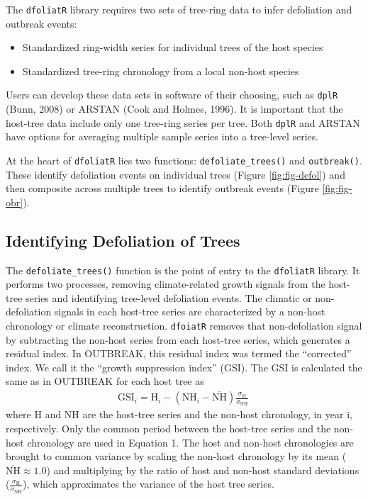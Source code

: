 \documentclass[review]{elsarticle} %
\providecommand{\tightlist}{%
  \setlength{\itemsep}{0pt}\setlength{\parskip}{0pt}}
\begin{document}
The \texttt{dfoliatR} library requires two sets of tree-ring data to infer defoliation and outbreak events:

\begin{itemize}
\tightlist
\item
  Standardized ring-width series for individual trees of the host species
\item
  Standardized tree-ring chronology from a local non-host species
\end{itemize}

Users can develop these data sets in software of their choosing, such as \texttt{dplR} (Bunn, 2008) or ARSTAN (Cook and Holmes, 1996). It is important that the host-tree data include only one tree-ring series per tree. Both \texttt{dplR} and ARSTAN have options for averaging multiple sample series into a tree-level series.

At the heart of \texttt{dfoliatR} lies two functions: \texttt{defoliate\_trees()} and \texttt{outbreak()}. These identify defoliation events on individual trees (Figure \ref{fig:fig-defol}) and then composite across multiple trees to identify outbreak events (Figure \ref{fig:fig-obr}).

\hypertarget{identifying-defoliation-of-trees}{%
\subsection{Identifying Defoliation of Trees}\label{identifying-defoliation-of-trees}}

The \texttt{defoliate\_trees()} function is the point of entry to the \texttt{dfoliatR} library. It performs two processes, removing climate-related growth signals from the host-tree series and identifying tree-level defoliation events. The climatic or non-defoliation signals in each host-tree series are characterized by a non-host chronology or climate reconstruction. \texttt{dfoiatR} removes that non-defoliation signal by subtracting the non-host series from each host-tree series, which generates a residual index. In OUTBREAK, this residual index was termed the ``corrected'' index. We call it the ``growth suppression index'' (GSI). The GSI is calculated the same as in OUTBREAK for each host tree as
\begin{align}
\textrm{GSI}_{i} = \textrm{H}_{i} - \left( \textrm{NH}_{i} - \overline{\textrm{NH}} \right) \frac{\sigma_{\textrm{H}}}{\sigma_{\textrm{NH}}} \
\end{align}
where H and NH are the host-tree series and the non-host chronology, in year i, respectively. Only the common period between the host-tree series and the non-host chronology are used in Equation 1. The host and non-host chronologies are brought to common variance by scaling the non-host chronology by its mean (\(\overline{\textrm{NH}} \approx 1.0\)) and multiplying by the ratio of host and non-host standard deviations (\(\frac{\sigma_{\textrm{H}}}{\sigma_{\textrm{NH}}}\)), which approximates the variance of the host tree series.
\end{document}
